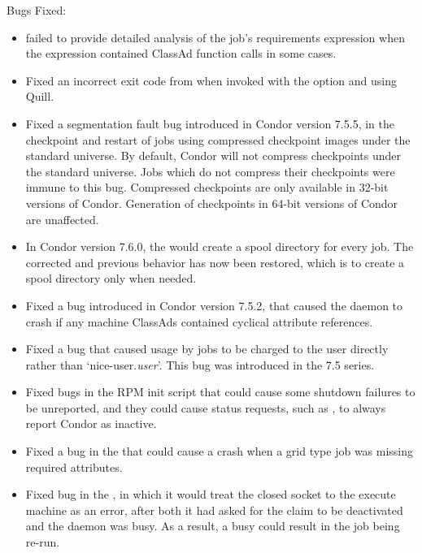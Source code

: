 \noindent Bugs Fixed:

\begin{itemize}

\item {}  failed to provide detailed analysis of
the job's requirements expression when the expression contained ClassAd
function calls in some cases. 

\item Fixed an incorrect exit code from  
when invoked with the  option and using Quill.

\item Fixed a segmentation fault bug introduced in Condor version 7.5.5,
in the checkpoint and restart of jobs using compressed checkpoint images
under the standard universe.
By default, Condor will not compress checkpoints under the standard universe.
Jobs which do not compress their checkpoints were immune to this bug.  
Compressed checkpoints are only available in 32-bit versions of Condor.
Generation of checkpoints in 64-bit versions of Condor are unaffected.

\item In Condor version 7.6.0, the  would create a 
spool directory for every job. The corrected and previous behavior 
has now been restored, 
which is to create a spool directory only when needed.

\item Fixed a bug introduced in Condor version 7.5.2,
that caused the  daemon to crash
if any machine ClassAds contained cyclical attribute references.

\item Fixed a bug that caused usage by  jobs to
be charged to the user directly rather than `nice-user.\emph{user}'.
This bug was introduced in the 7.5 series.

\item Fixed bugs in the RPM init script that could cause some 
shutdown failures to be unreported, 
and they could cause status requests,
such as ,
to always report Condor as inactive.

\item Fixed a bug in the  that could cause a crash 
when a grid type  job was missing required attributes.

\item Fixed bug in the , in which it would treat 
the closed socket to the execute machine as an error,
after both it had asked for the claim to be deactivated and the 
 daemon was busy.  
As a result, a busy  could result in the job being re-run.


\end{itemize}
